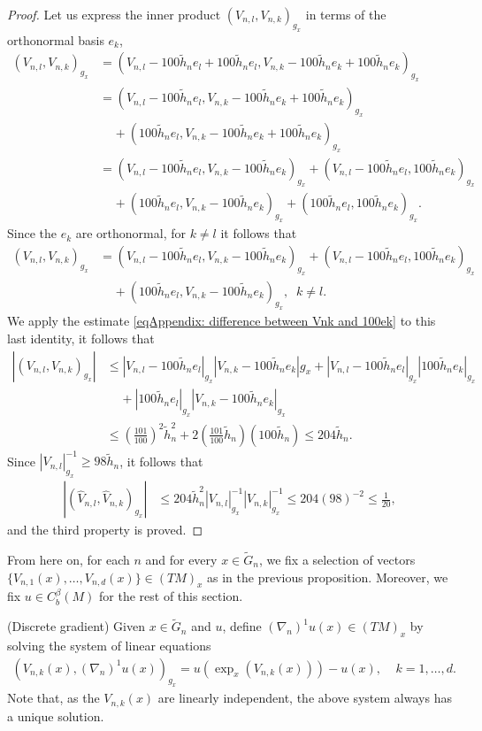 \documentclass[11pt,reqno]{amsart}
\numberwithin{equation}{section}
\theoremstyle{plain}
\begin{document}
\begin{proof}
  Let us express the inner product $(V_{n,l},V_{n,k})_{g_x}$ in terms of the orthonormal basis $e_k$,
  \begin{align*}
    (V_{n,l},V_{n,k})_{g_x} & = (V_{n,l}-100\tilde h_ne_l+100\tilde h_ne_l,V_{n,k}-100\tilde h_ne_k+100\tilde h_ne_k)_{g_x}\\
	  & = (V_{n,l}-100\tilde h_ne_l,V_{n,k}-100\tilde h_ne_k+100\tilde h_ne_k)_{g_x}\\
	  & \;\;\;\;+(100\tilde h_ne_l,V_{n,k}-100\tilde h_ne_k+100\tilde h_ne_k)_{g_x}\\
	  & = (V_{n,l}-100\tilde h_ne_l,V_{n,k}-100\tilde h_ne_k)_{g_x}+(V_{n,l}-100\tilde h_ne_l,100\tilde h_ne_k)_{g_x}\\
	  & \;\;\;\;+(100\tilde h_ne_l,V_{n,k}-100\tilde h_ne_k)_{g_x}+(100\tilde h_ne_l,100\tilde h_ne_k)_{g_x}.	  
  \end{align*} 
  Since the $e_k$ are orthonormal, for $k\neq l$ it follows that 
  \begin{align*}
    (V_{n,l},V_{n,k})_{g_x} & = (V_{n,l}-100\tilde h_ne_l,V_{n,k}-100\tilde h_ne_k)_{g_x}+(V_{n,l}-100\tilde h_ne_l,100\tilde h_ne_k)_{g_x}\\
	  & \;\;\;\;+(100\tilde h_ne_l,V_{n,k}-100\tilde h_ne_k)_{g_x},\;\; k\neq l.
  \end{align*}    
  We apply the estimate \eqref{eqAppendix: difference between Vnk and 100ek} to this last identity, it follows that
  \begin{align*}
    |(V_{n,l},V_{n,k})_{g_x}| & \leq | V_{n,l}-100\tilde h_ne_l |_{g_x} |V_{n,k}-100\tilde h_ne_k|{g_x}+|V_{n,l}-100\tilde h_ne_l|_{g_x} |100\tilde h_ne_k|_{g_x}\\
	  & \;\;\;\;+|100\tilde h_ne_l|_{g_x}|V_{n,k}-100\tilde h_ne_k|_{g_x} \\
	  & \leq (\tfrac{101}{100})^2\tilde h_n^2+ 2(\tfrac{101}{100}\tilde h_n)(100 \tilde h_n) \leq 204\tilde h_n.
  \end{align*}  
  Since $|V_{n,l}|_{g_x}^{-1}\geq 98 \tilde h_n$, it follows that
  \begin{align*}
    |(\hat V_{n,l},\hat V_{n,k})_{g_x}| & \leq 204 \tilde h_n^2  |V_{n,l}|_{g_x}^{-1}|V_{n,k}|_{g_x}^{-1} \leq 204 (98)^{-2}\leq \tfrac{1}{20},
  \end{align*}
  and the third property is proved. 
\end{proof}

From here on, for each $n$ and for every $x\in \tilde G_n$, we fix a selection of vectors $\{V_{n,1}(x),\ldots,V_{n,d}(x)\} \in (TM)_x$ as in the previous proposition. Moreover, we fix $u \in C^\beta_b(M)$ for the rest of this section.
\begin{DEF}\label{def:Appendix Discrete Gradient} (Discrete gradient)
  Given $x\in \tilde G_n$ and $u$, define $(\nabla_n)^1u(x) \in (TM)_x$ by solving the system of linear equations
  \begin{align*}
     (V_{n,k}(x),(\nabla_n)^1u(x))_{g_x} = u(\exp_{x}(V_{n,k}(x)))-u(x),\;\;\;\;k=1,\ldots,d.       
  \end{align*}
  Note that, as the $V_{n,k}(x)$ are linearly independent, the above system always has a unique solution.
\end{DEF}
\end{document}
